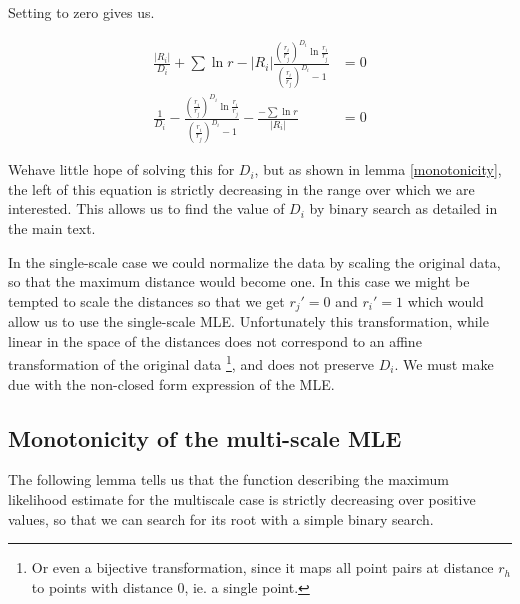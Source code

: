 \documentclass[10pt]{article}
\begin{document}
Setting to zero gives us.

\begin{align*}
\frac{|R_i|}{D_i} + \sum \ln r - |R_i| \frac{\left(\frac{r_i}{r_j}\right)^{D_i} \ln \frac{r_i}{r_j}}{\left(\frac{r_i}{r_j}\right)^{D_i} -1} &= 0 \\
\frac{1}{D_i}  - \frac{\left(\frac{r_i}{r_j}\right)^{D_i} \ln \frac{r_i}{r_j}}{\left(\frac{r_i}{r_j}\right)^{D_i} -1} - \frac{-\sum \ln r}{|R_i|} &= 0  
\end{align*}

Wehave little hope of solving this for $D_i$, but as shown in lemma \ref{monotonicity}, the left of this equation is strictly decreasing in the range over which we are interested. This allows us to find the value of $D_i$ by binary search as detailed in the main text.

In the single-scale case we could normalize the data by scaling the original data, so that the maximum distance would become one. In this case we might be tempted to scale the distances so that we get $r_j' = 0$ and $r_i' = 1$ which would allow us to use the single-scale MLE. Unfortunately this transformation, while linear in the space of the distances does not correspond to an affine transformation of the original data \footnote{Or even a bijective transformation, since it maps all point pairs at distance $r_h$ to points with distance $0$, ie. a single point.}, and does not preserve $D_i$. We must make due with the non-closed form expression of the MLE.

\subsection{Monotonicity of the multi-scale MLE}

The following lemma tells us that the function describing the maximum likelihood estimate for the multiscale case is strictly decreasing over positive values, so that we can search for its root with a simple binary search.
\end{document}
